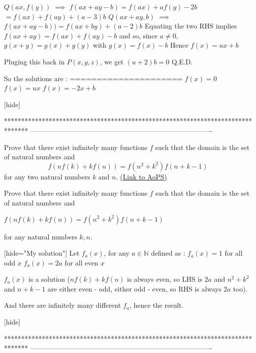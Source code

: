 \begin{solution}
$ Q(ax,f(y))$ $ \implies$ $ f(ax + ay - b) = f(ax) + af(y) - 2b$ $ = f(ax) + f(ay) + (a - 3)b$
$ Q(ax + ay,b)$ $ \implies$ $ f(ax + ay - b)) = f(ax + by) + (a - 2)b$
Equating the two RHS implies $ f(ax + ay) = f(ax) + f(ay) - b$ and so, since $ a\neq 0$, $ g(x + y) = g(x) + g(y)$ with $ g(x) = f(x) - b$
Hence $ f(x) = ux + b$

Pluging this back in $ P(x,y,z)$, we get $ (u + 2)b = 0$
Q.E.D.

So the solutions are :
=====================
$ f(x) = 0$
$ f(x) = ux$
$ f(x) = - 2x + b$

[\/hide]
\end{solution}
*******************************************************************************
-------------------------------------------------------------------------------

\begin{problem}
	Prove that there exist infinitely many functions $ f$ such that the domain is the set of natural numbers and
\[f(nf(k)+kf(n))=f(n^2+k^2)f(n+k-1)\]
for any two natural numbers $ k$ and $n$.
	\flushright \href{https://artofproblemsolving.com/community/c6h214232}{(Link to AoPS)}
\end{problem}



\begin{solution}
	\begin{tcolorbox}Prove that there exist infinitely many functions $ f$ such that the domain is the set of natural numbers and

$ f(nf(k) + kf(n)) = f(n^2 + k^2)f(n + k - 1)$

for any natural numbers $ k,n$.\end{tcolorbox}
[hide="My solution"]
Let $ f_a(x)$, for any $ a\in\mathbb N$ defined as :
$ f_a(x)=1$ for all odd $ x$
$ f_a(x)=2a$ for all even $ x$

$ f_a(x)$ is a solution ($ nf(k)+kf(n)$ is always even, so LHS is $ 2a$ and $ n^2+k^2$ and $ n+k-1$ are either even - odd, either odd - even, so RHS is always $ 2a$ too).

And there are infinitely many different $ f_a$, hence the result.

[\/hide]
\end{solution}
*******************************************************************************
-------------------------------------------------------------------------------

